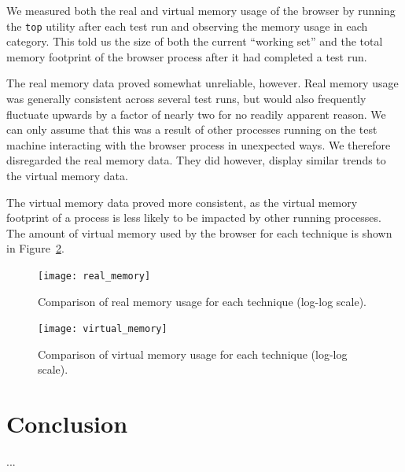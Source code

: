 \documentclass[acmtocl,acmnow]{acmtrans2m}
\begin{document}
We measured both the real and virtual memory usage of the browser by
running the \texttt{top} utility after each test run and observing the
memory usage in each category. This told us the size of both the current
``working set'' and the total memory footprint of the browser process
after it had completed a test run.


The real memory data proved somewhat unreliable, however. Real memory
usage was generally consistent across several test runs, but would also
frequently fluctuate upwards by a factor of nearly two for no readily
apparent reason. We can only assume that this was a result of other
processes running on the test machine interacting with the browser
process in unexpected ways. We therefore disregarded the real memory
data. They did however, display similar trends to the virtual memory
data.

The virtual memory data proved more consistent, as the virtual memory
footprint of a process is less likely to be impacted by other running
processes. The amount of virtual memory used by the browser for each
technique is shown in Figure~\ref{fig-virtual-memory}.


\begin{figure}
	\begin{center}
		\texttt{[image: real\_memory]}
	\end{center}
	\caption{Comparison of real memory usage for each technique (log-log scale).}
	\label{fig-virtual-memory}
\end{figure}


\begin{figure}
	\begin{center}
		\texttt{[image: virtual\_memory]}
	\end{center}
	\caption{Comparison of virtual memory usage for each technique (log-log scale).}
	\label{fig-virtual-memory}
\end{figure}


\section{Conclusion}








\begin{received}
...
\end{received}
\end{document}
